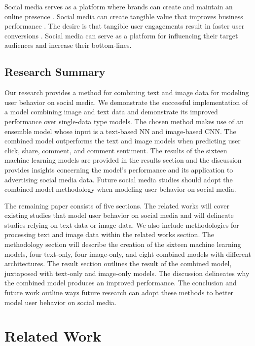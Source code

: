\documentclass{article}
\begin{document}
Social media serves as a platform where brands can create and maintain an online presence \cite{Greenwood2016}. Social media can create tangible value that improves business performance \cite{Authors2013}. The desire is that tangible user engagements result in faster user conversions \cite{Authors2013}. Social media can serve as a platform for influencing their target audiences and increase their bottom-lines.

\subsection{Research Summary}

Our research provides a method for combining text and image data for modeling user behavior on social media. We demonstrate the successful implementation of a model combining image and text data and demonstrate its improved performance over single-data type models. The chosen method makes use of an ensemble model whose input is a text-based NN and image-based CNN. The combined model outperforms the text and image models when predicting user click, share, comment, and comment sentiment. The results of the sixteen machine learning models are provided in the results section and the discussion provides insights concerning the model's performance and its application to advertising social media data. Future social media studies should adopt the combined model methodology when modeling user behavior on social media.

The remaining paper consists of five sections. The related works will cover existing studies that model user behavior on social media and will delineate studies relying on text data or image data. We also include methodologies for processing text and image data within the related works section. The methodology section will describe the creation of the sixteen machine learning models, four text-only, four image-only, and eight combined models with different architectures. The result section outlines the result of the combined model, juxtaposed with text-only and image-only models. The discussion delineates why the combined model produces an improved performance. The conclusion and future work outline ways future research can adopt these methods to better model user behavior on social media.

\section{Related Work}
\end{document}
